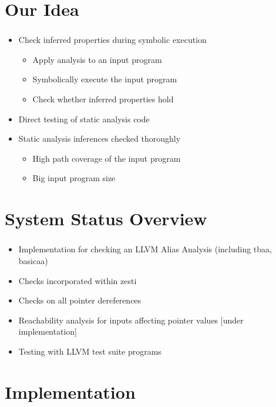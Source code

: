 \documentclass[mathserif,10pt]{beamer}
\begin{document}
\section{Our Idea}
\frame
{
  \frametitle{\secname}
  \begin{itemize} [<+->]
    \item Check inferred properties during symbolic execution
    \begin{itemize}
      \item Apply analysis to an input program
      \item Symbolically execute the input program
      \item Check whether inferred properties hold
    \end{itemize} 
    \vspace{1cm}
    \item Direct testing of static analysis code
    \vspace{1cm}
    \item Static analysis inferences checked thoroughly
    \begin{itemize}
      \item High path coverage of the input program
      \item Big input program size
    \end{itemize} 
  \end{itemize} 
}

\section{System Status Overview}
\frame
{
  \frametitle{\secname}
  \begin{itemize} [<+->]
    \item Implementation for checking an LLVM Alias Analysis (including tbaa, basicaa)
    \vspace{1cm}
    \item Checks incorporated within zesti
    \vspace{1cm}
    \item Checks on all pointer dereferences
    \vspace{1cm}
    \item Reachability analysis for inputs affecting pointer values [under implementation]
    \vspace{1cm}
    \item Testing with LLVM test suite programs
  \end{itemize} 
}

\section{Implementation}
\end{document}
